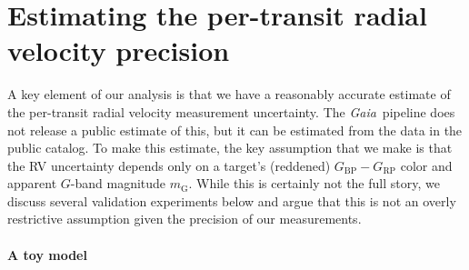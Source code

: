 \documentclass[modern, letterpaper]{aastex63}
\newcommand{\project}[1]{\textsl{#1}}
\newcommand{\Gaia}{\project{Gaia}}
\begin{document}
\section{Estimating the per-transit radial velocity precision}

A key element of our analysis is that we have a reasonably accurate estimate of the per-transit radial velocity measurement uncertainty.
The \Gaia\ pipeline does not release a public estimate of this, but it can be estimated from the data in the public catalog.
To make this estimate, the key assumption that we make is that the RV uncertainty depends only on a target's (reddened) $G_\mathrm{BP} - G_\mathrm{RP}$ color and apparent $G$-band magnitude $m_\mathrm{G}$.
While this is certainly not the full story, we discuss several validation experiments below and argue that this is not an overly restrictive assumption given the precision of our measurements.

\paragraph{A toy model}
\end{document}

